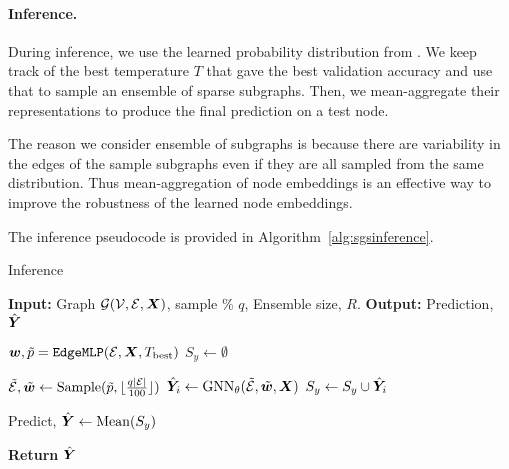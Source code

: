 \clearpage
\paragraph{Inference.} 
During inference, we use the learned probability distribution from \edgemlp. We keep track of the best temperature $T$ that gave the best validation accuracy and use that to sample an ensemble of sparse subgraphs. Then, we mean-aggregate their representations to produce the final
prediction on a test node. 

The reason we consider ensemble of subgraphs is because there are variability in the edges of the sample subgraphs even if they are all sampled from the same distribution. Thus mean-aggregation of node embeddings is an effective way to improve the robustness of the learned node embeddings. 

The inference pseudocode is provided in Algorithm~\ref{alg:sgsinference}.

\begin{algorithm}[!htbp]
\caption{\sgs Inference}
\begin{algorithmic}[1] %
\STATE \textbf{Input:} Graph ${\mathcal{G}} ({\mathcal{V}}, {\mathcal{E}}, {\bm{X}})$, sample \% $q$, Ensemble size, $R$.
\STATE \textbf{Output:} Prediction, $\hat{{\bm{Y}}}$

    \STATE ${\bm{w}}, \tilde{p} = \texttt{EdgeMLP}({\mathcal{E}}, {\bm{X}}, T_\mathrm{best})$    
    \STATE $S_y \gets \emptyset$ 
    
        \STATE $\tilde{{\mathcal{E}}}, \tilde{{\bm{w}}} \gets \mathrm{Sample}(\tilde{p},\lfloor \frac{q|{\mathcal{E}}|}{100} \rfloor)$        
        \STATE $\hat{{\bm{Y}}}_i \gets \mathrm{GNN}_\theta(\tilde{{\mathcal{E}}},\tilde{{\bm{w}}},{\bm{X}})$
        \STATE $S_y \gets S_y \cup \hat{{\bm{Y}}}_i$
    \ENDFOR

    \STATE Predict, $\hat{{\bm{Y}}} \gets \mathrm{Mean} (S_y)$
    
\STATE \textbf{Return} $\hat{{\bm{Y}}}$
\end{algorithmic}
\label{alg:sgsinference}
\end{algorithm}
\clearpage